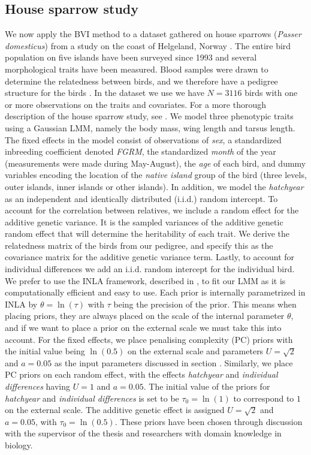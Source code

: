 \subsection{House sparrow study}
We now apply the BVI method to a dataset gathered on house sparrows (\textit{Passer domesticus}) from a study on the coast of Helgeland, Norway \citep{Stensland_GMRF_bayes_animal_model}. The entire bird population on five islands have been surveyed since 1993 and several morphological traits have been measured. Blood samples were drawn to determine the relatedness between birds, and we therefore have a pedigree structure for the birds \citep[citing Jensen et al., 2003, 2004, 2008]{Stensland_GMRF_bayes_animal_model}. In the dataset we use we have $N=3116$ birds with one or more observations on the traits and covariates. For a more thorough description of the house sparrow study, see \citet[and references therein]{Stensland_GMRF_bayes_animal_model}. We model three phenotypic traits using a Gaussian LMM, namely the body mass, wing length and tarsus length. The fixed effects in the model consist of observations of \textit{sex}, a standardized inbreeding coefficient denoted \textit{FGRM}, the standardized \textit{month} of the year (measurements were made during May-August), the \textit{age} of each bird, and dummy variables encoding the location of the \textit{native island} group of the bird (three levels, outer islands, inner islands or other islands). In addition, we model the \textit{hatchyear}  as an independent and identically distributed (i.i.d.) random intercept. To account for the correlation between relatives, we include a random effect for the additive genetic variance. It is the sampled variances of the additive genetic random effect that will determine the heritability of each trait. We derive the relatedness matrix of the birds from our pedigree, and specify this as the covariance matrix for the additive genetic variance term. Lastly, to account for individual differences we add an i.i.d. random intercept for the individual bird. We prefer to use the INLA framework, described in , to fit our LMM as it is computationally efficient and easy to use. Each prior is internally parametrized in INLA by $\theta=\ln(\tau)$ with $\tau$ being the precision of the prior. This means when placing priors, they are always placed on the scale of the internal parameter $\theta$, and if we want to place a prior on the external scale we must take this into account. For the fixed effects, we place penalising complexity (PC) priors with the initial value being $\ln(0.5)$ on the external scale and parameters $U=\sqrt{2}$ and $a=0.05$ as the input parameters discussed in section . Similarly, we place PC priors on each random effect, with the effects \textit{hatchyear} and \textit{individual differences} having $U=1$ and $a=0.05$. The initial value of the priors for \textit{hatchyear} and \textit{individual differences} is set to be $\tau_0=\ln(1)$ to correspond to $1$ on the external scale. The additive genetic effect is assigned $U=\sqrt{2}$ and $a=0.05$, with $\tau_0=\ln(0.5)$. These priors have been chosen through discussion with the supervisor of the thesis and researchers with domain knowledge in biology. 